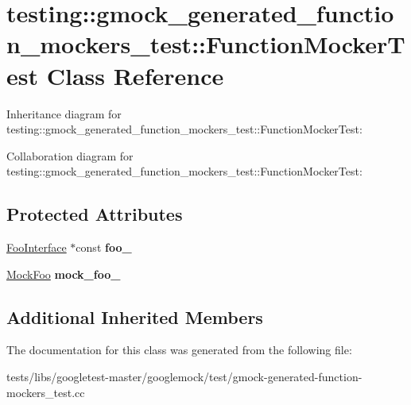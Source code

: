 \hypertarget{classtesting_1_1gmock__generated__function__mockers__test_1_1FunctionMockerTest}{}\section{testing\+:\+:gmock\+\_\+generated\+\_\+function\+\_\+mockers\+\_\+test\+:\+:Function\+Mocker\+Test Class Reference}
\label{classtesting_1_1gmock__generated__function__mockers__test_1_1FunctionMockerTest}


Inheritance diagram for testing\+:\+:gmock\+\_\+generated\+\_\+function\+\_\+mockers\+\_\+test\+:\+:Function\+Mocker\+Test\+:


Collaboration diagram for testing\+:\+:gmock\+\_\+generated\+\_\+function\+\_\+mockers\+\_\+test\+:\+:Function\+Mocker\+Test\+:
\subsection*{Protected Attributes}
\begin{DoxyCompactItemize}
\item 
\mbox{\label{classtesting_1_1gmock__generated__function__mockers__test_1_1FunctionMockerTest_ae2b8b577c4808f2dff9797168468f65f}} 
\hyperlink{classtesting_1_1gmock__generated__function__mockers__test_1_1FooInterface}{Foo\+Interface} $\ast$const {\bfseries foo\+\_\+}
\item 
\mbox{\label{classtesting_1_1gmock__generated__function__mockers__test_1_1FunctionMockerTest_a265659f07a0e75152ab295add4769585}} 
\hyperlink{classtesting_1_1gmock__generated__function__mockers__test_1_1MockFoo}{Mock\+Foo} {\bfseries mock\+\_\+foo\+\_\+}
\end{DoxyCompactItemize}
\subsection*{Additional Inherited Members}


The documentation for this class was generated from the following file\+:\begin{DoxyCompactItemize}
\item 
tests/libs/googletest-\/master/googlemock/test/gmock-\/generated-\/function-\/mockers\+\_\+test.\+cc\end{DoxyCompactItemize}
